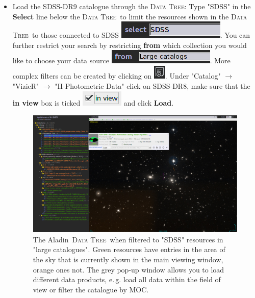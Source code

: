 \documentclass [a4paper, 12pt]{article}
\newcommand{\aladin}{{\textsc{A}{ladin}}}
\newcommand{\datatree}{\textsc{Data Tree}}
\begin{document}
\begin{itemize}
\item Load the SDSS-DR9 catalogue through the \datatree: Type "SDSS" in the 
\textbf{Select} line below the \datatree\ to limit the resources shown in the 
\datatree\ to those connected to SDSS \includegraphics[width=0.2 
\textwidth]{../images/aladin_select_SDSS.png}. You can further restrict your 
search by restricting \textbf{from} which collection you would like to choose 
your data source \includegraphics[width=0.2 
\textwidth]{../images/aladin_selectfrom_largecatalogues.png}. More complex 
filters can be created by clicking on \includegraphics[width=0.03 
\textwidth]{../images/aladin_button_filtertree.png}. Under "Catalog" 
$\rightarrow$ "VizieR" $\rightarrow$ "II-Photometric Data" click on SDSS-DR8, 
make sure that the \textbf{in view} box is ticked \includegraphics[width=0.07 
\textwidth]{../images/aladin_load_inview.png} and click \textbf{Load}.

\begin{figure}[H]
\center
\includegraphics[width=0.85  
\textwidth]{../images/aladin_load_sdss_a1656.png}
\caption{The \aladin\ \datatree\ when filtered to "SDSS" resources in "large 
catalogues". Green resources have entries in the area of the sky that is 
currently shown in the main viewing window, orange ones not. The grey pop-up 
window allows you to load different data products, e.\,g. load all data within 
the field of view or filter the catalogue by MOC. }
\label{fig:aladinSDSS}
\end{figure}


\end{itemize}
\end{document}
